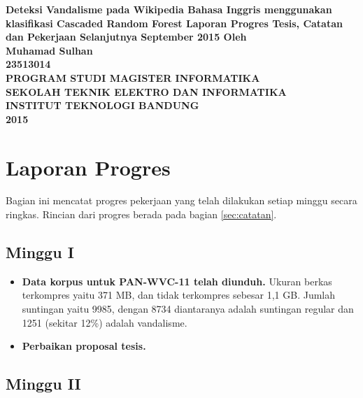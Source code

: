 \documentclass[12pt,a4paper,titlepage]{article}
\author{\myname}
\title{\mytitle}
\newcommand{\mytitle}{Deteksi Vandalisme pada Wikipedia Bahasa Inggris menggunakan klasifikasi Cascaded Random Forest}
\newcommand{\myname}{Muhamad Sulhan}
\newcommand{\mysid}{23513014}
\begin{document}
\thispagestyle{empty}
\begin{center}
	\textbf{%
		\mytitle
		\vfill
		Laporan Progres Tesis, Catatan dan Pekerjaan Selanjutnya
		\linebreak
		 September 2015
		\vfill
		Oleh \\
		\myname \\
		\mysid \\
		\vfill
		\uppercase{%
			Program Studi Magister Informatika \\
			Sekolah Teknik Elektro dan Informatika \\
			Institut Teknologi Bandung \\
			2015
		}
	}
\end{center}
\newpage

\section{Laporan Progres}

Bagian ini mencatat progres pekerjaan yang telah dilakukan setiap minggu secara ringkas.
Rincian dari progres berada pada bagian \ref{sec:catatan}.

\subsection{Minggu I}

\begin{itemize}
	\item \textbf{Data korpus untuk PAN-WVC-11 telah diunduh.}
Ukuran berkas terkompres yaitu 371 MB, dan tidak terkompres sebesar 1,1 GB.
Jumlah suntingan yaitu 9985, dengan 8734 diantaranya adalah suntingan regular dan 1251 (sekitar 12\%) adalah vandalisme.

	\item \textbf{Perbaikan proposal tesis.}
\end{itemize}

\subsection{Minggu II}
\end{document}
